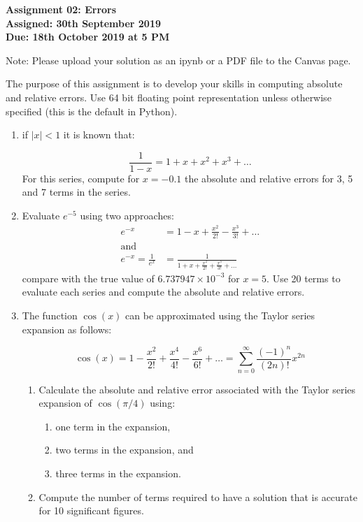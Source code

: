 \documentclass[a4paper,12pt]{article}
\begin{document}
\begin{centering}
	\textbf{
		Assignment 02: Errors\\
		Assigned: 30th September 2019\\
		Due: 18th October 2019 at 5 PM\\
	}
\end{centering}


Note: Please upload your solution as an ipynb or a PDF file to the Canvas page.

\vspace{1em}
 
 The purpose of this assignment is to develop your skills in computing absolute and relative errors. Use 64 bit floating point representation unless otherwise specified (this is the default in Python).
 
\begin{enumerate}
	
	\item if $\vert x \vert < 1$ it is known that:
	
	\begin{equation*}
	\frac{1}{1 - x} = 1 + x + x^2 + x^3 + \dots
	\end{equation*}
	For this series, compute for $x = -0.1$ the absolute and relative errors for 3, 5 and 7 terms in the series. 
	
	\item Evaluate $e^{-5}$ using two approaches:
		\begin{align*}
			e^{-x} &  = 1 - x + \frac{x^2}{2!} - \frac{x^3}{3!} + \dots \\
			\mathrm{and}\\
			e^{-x} = \frac{1}{e^x} & = \frac{1}{1 + x + \frac{x^2}{2!} + \frac{x^3}{3!} + \dots} 
		\end{align*}
		compare with the true value of $6.737947 \times 10^{-3}$ for $x = 5$. Use 20 terms to evaluate each series and compute the absolute and relative errors.
		
	\item The function $\cos(x)$ can be approximated using the Taylor series expansion as follows:
	
		\begin{equation*}
		\cos(x) = 1 - \frac{x^2}{2!} + \frac{x^4}{4!} - \frac{x^6}{6!}+ \dots = \sum_{n = 0}^{\infty}\frac{(-1)^n}{(2n)!}x^{2n}
		\end{equation*}
	\begin{enumerate}
	\item Calculate the absolute and relative error associated with the Taylor series expansion of $\cos(\pi/4)$ using:
		\begin{enumerate}
			\item one term in the expansion,
			\item two terms in the expansion, and
			\item three terms in the expansion.
		\end{enumerate}
	\item Compute the number of terms required to have a solution that is accurate for 10 significant figures.		
	\end{enumerate}


\end{enumerate}
\end{document}
